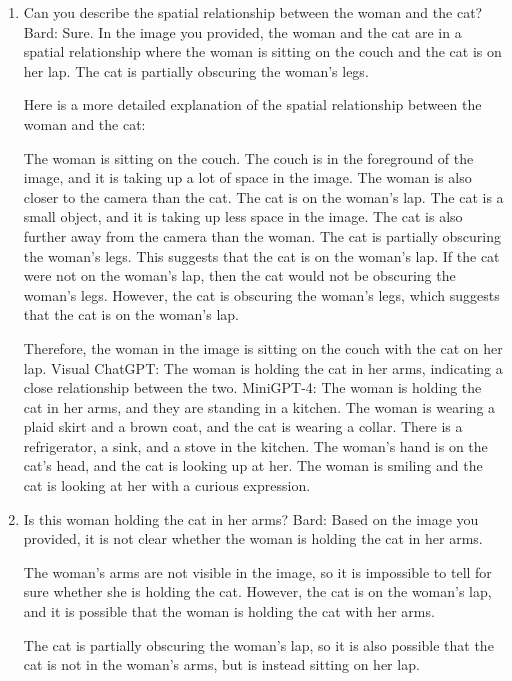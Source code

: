 \begin{enumerate}
    \item Can you describe the spatial relationship between the woman and the cat?
    \subitem Bard: 
    Sure. In the image you provided, the woman and the cat are in a spatial relationship where the woman is sitting on the couch and the cat is on her lap. The cat is partially obscuring the woman's legs.
    
    Here is a more detailed explanation of the spatial relationship between the woman and the cat:
    
    The woman is sitting on the couch. The couch is in the foreground of the image, and it is taking up a lot of space in the image. The woman is also closer to the camera than the cat.
    The cat is on the woman's lap. The cat is a small object, and it is taking up less space in the image. The cat is also further away from the camera than the woman.
    The cat is partially obscuring the woman's legs. This suggests that the cat is on the woman's lap.
    If the cat were not on the woman's lap, then the cat would not be obscuring the woman's legs. However, the cat is obscuring the woman's legs, which suggests that the cat is on the woman's lap.
    
    Therefore, the woman in the image is sitting on the couch with the cat on her lap.
    \subitem Visual ChatGPT: The woman is holding the cat in her arms, indicating a close relationship between the two.
    \subitem MiniGPT-4: The woman is holding the cat in her arms, and they are standing in a kitchen. The woman is wearing a plaid skirt and a brown coat, and the cat is wearing a collar. There is a refrigerator, a sink, and a stove in the kitchen. The woman’s hand is on the cat’s head, and the cat is looking up at her. The woman is smiling and the cat is looking at her with a curious expression.
    \item Is this woman holding the cat in her arms?
    \subitem Bard: 
    Based on the image you provided, it is not clear whether the woman is holding the cat in her arms.
    
    The woman's arms are not visible in the image, so it is impossible to tell for sure whether she is holding the cat. However, the cat is on the woman's lap, and it is possible that the woman is holding the cat with her arms.
    
    The cat is partially obscuring the woman's lap, so it is also possible that the cat is not in the woman's arms, but is instead sitting on her lap.
    

\end{enumerate}
